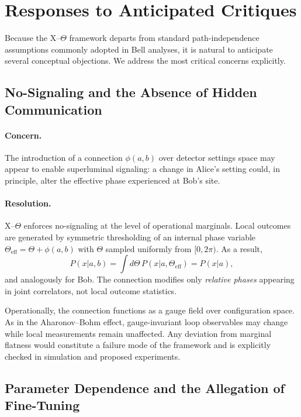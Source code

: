 \section{Responses to Anticipated Critiques}
\label{sec:responses}

Because the X--$\Theta$ framework departs from standard path-independence assumptions
commonly adopted in Bell analyses, it is natural to anticipate several conceptual objections.
We address the most critical concerns explicitly.

\subsection{No-Signaling and the Absence of Hidden Communication}

\paragraph{Concern.}
The introduction of a connection $\phi(a,b)$ over detector settings space may appear
to enable superluminal signaling: a change in Alice’s setting could, in principle,
alter the effective phase experienced at Bob’s site.

\paragraph{Resolution.}
X--$\Theta$ enforces no-signaling at the level of operational marginals.
Local outcomes are generated by symmetric thresholding of an internal phase variable
$\Theta_{\mathrm{eff}} = \Theta + \phi(a,b)$ with $\Theta$ sampled uniformly from $[0,2\pi)$.
As a result,
\begin{equation}
P(x|a,b) = \int d\Theta\, P(x|a,\Theta_{\mathrm{eff}}) = P(x|a),
\end{equation}
and analogously for Bob.
The connection modifies only \emph{relative phases} appearing in joint correlators,
not local outcome statistics.

Operationally, the connection functions as a gauge field over configuration space.
As in the Aharonov--Bohm effect, gauge-invariant loop observables may change while
local measurements remain unaffected.
Any deviation from marginal flatness would constitute a failure mode of the framework
and is explicitly checked in simulation and proposed experiments.

\subsection{Parameter Dependence and the Allegation of Fine-Tuning}

